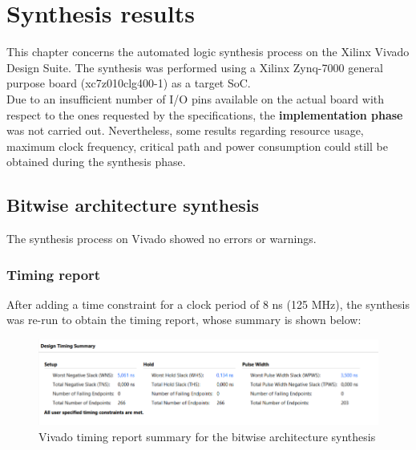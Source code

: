 %
\chapter{Synthesis results}\label{ch:synth_results}
This chapter concerns the automated logic synthesis process on the Xilinx Vivado Design Suite. The synthesis was performed using a Xilinx Zynq-7000 general purpose board (xc7z010clg400-1) as a target SoC.\\
Due to an insufficient number of I/O pins available on the actual board with respect to the ones requested by the specifications, the \textbf{implementation phase} was not carried out. Nevertheless, some results regarding resource usage, maximum clock frequency, critical path and power consumption could still be obtained during the synthesis phase.

\section{Bitwise architecture synthesis}
The synthesis process on Vivado showed no errors or warnings.\\

\subsection{Timing report}
After adding a time constraint for a clock period of 8 ns (125 MHz), the synthesis was re-run to obtain the timing report, whose summary is shown below:

\begin{figure}[H]
    \begin{center}
        \includegraphics[scale=.75,clip]{img/vivado_bit_timing.png}
    \end{center}
    \vspace*{-0.5cm}
    \caption{Vivado timing report summary for the bitwise architecture synthesis}
    \label{fig:vivado_bit_timing}
\end{figure}

